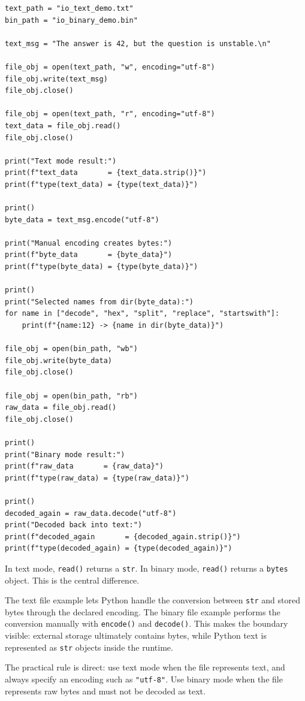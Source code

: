 \begin{verbatim}
text_path = "io_text_demo.txt"
bin_path = "io_binary_demo.bin"

text_msg = "The answer is 42, but the question is unstable.\n"

file_obj = open(text_path, "w", encoding="utf-8")
file_obj.write(text_msg)
file_obj.close()

file_obj = open(text_path, "r", encoding="utf-8")
text_data = file_obj.read()
file_obj.close()

print("Text mode result:")
print(f"text_data       = {text_data.strip()}")
print(f"type(text_data) = {type(text_data)}")

print()
byte_data = text_msg.encode("utf-8")

print("Manual encoding creates bytes:")
print(f"byte_data       = {byte_data}")
print(f"type(byte_data) = {type(byte_data)}")

print()
print("Selected names from dir(byte_data):")
for name in ["decode", "hex", "split", "replace", "startswith"]:
    print(f"{name:12} -> {name in dir(byte_data)}")

file_obj = open(bin_path, "wb")
file_obj.write(byte_data)
file_obj.close()

file_obj = open(bin_path, "rb")
raw_data = file_obj.read()
file_obj.close()

print()
print("Binary mode result:")
print(f"raw_data       = {raw_data}")
print(f"type(raw_data) = {type(raw_data)}")

print()
decoded_again = raw_data.decode("utf-8")
print("Decoded back into text:")
print(f"decoded_again       = {decoded_again.strip()}")
print(f"type(decoded_again) = {type(decoded_again)}")
\end{verbatim}

In text mode, \texttt{read()} returns a \texttt{str}. In binary mode, \texttt{read()} returns a \texttt{bytes} object. This is the central difference.

The text file example lets Python handle the conversion between \texttt{str} and stored bytes through the declared encoding. The binary file example performs the conversion manually with \texttt{encode()} and \texttt{decode()}. This makes the boundary visible: external storage ultimately contains bytes, while Python text is represented as \texttt{str} objects inside the runtime.

The practical rule is direct: use text mode when the file represents text, and always specify an encoding such as \texttt{"utf-8"}. Use binary mode when the file represents raw bytes and must not be decoded as text.

